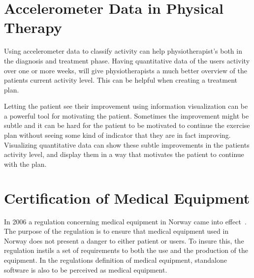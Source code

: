 \section{Accelerometer Data in Physical Therapy}
Using accelerometer data to classify activity can help physiotherapist's both in the diagnosis and treatment phase. Having quantitative data of the users activity over one or more weeks, will give physiotherapists a much better overview of the patients current activity level. This can be helpful when creating a treatment plan.

Letting the patient see their improvement using information visualization can be a powerful tool for motivating the patient. Sometimes the improvement might be subtle and it can be hard for the patient to be motivated to continue the exercise plan without seeing some kind of indicator that they are in fact improving. Visualizing quantitative data can show these subtle improvements in the patients activity level, and display them in a way that motivates the patient to continue with the plan.  

\section{Certification of Medical Equipment}
\label{sec:medicalEquipment}
In 2006 a regulation concerning medical equipment in Norway came into effect~\cite{medicalEquipment}. The purpose of the regulation is to ensure that medical equipment used in Norway does not present a danger to either patient or users. To insure this, the regulation instils a set of requirements to both the use and the production of the equipment. In the regulations definition of medical equipment, standalone software is also to be perceived as medical equipment.
